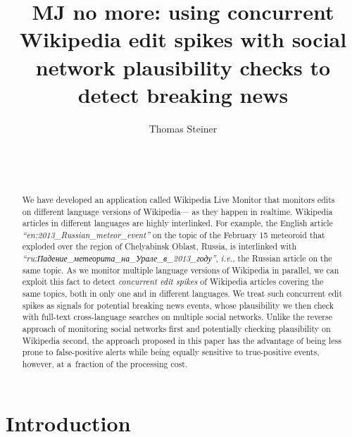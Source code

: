 \documentclass{sig-alternate}
\begin{document}
\title{MJ no more: using concurrent Wikipedia edit spikes with social network plausibility checks to detect breaking news}

\author{
\alignauthor
Thomas Steiner\\
	\\
	\\
	\\
}
\maketitle
\begin{abstract}
\selectfont
We have developed an application called Wikipedia Live Monitor
that monitors edits on different language versions of Wikipedia---%
as they happen in realtime.
Wikipedia articles in different languages are highly interlinked.
For example, the English article \emph{``en:2013\_Russian\_meteor\_event''}
on the topic of the February 15 meteoroid
that exploded over the region of Chelyabinsk Oblast, Russia,
is interlinked with \selectfont
\emph{``ru:Падение\_метеорита\_на\_Урале\_в\_2013\_году''},
\selectfont \emph{i.e.},
the Russian article on the same topic.
As we monitor multiple language versions of Wikipedia in parallel,
we can exploit this fact to detect \emph{concurrent edit spikes}
of Wikipedia articles covering the same topics,
both in only one and in different languages.
We treat such concurrent edit spikes as signals
for potential breaking news events, whose plausibility we then check 
with full-text cross-language searches on multiple social networks.
Unlike the reverse approach of monitoring social networks first
and potentially checking plausibility on Wikipedia second,
the approach proposed in this paper has the advantage of
being less prone to false-positive alerts while being equally sensitive
to true-positive events, however, at a~fraction of the processing cost.

\end{abstract}




\section{Introduction}
\end{document}
